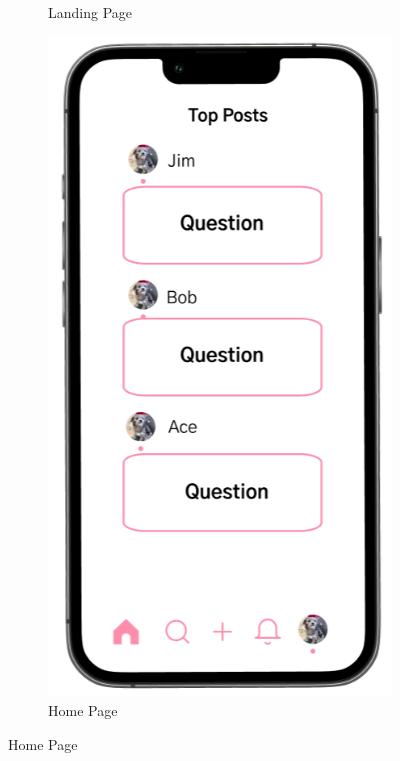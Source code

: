 \begin{figure}[!htbp]
\begin{subfigure}[b]{0.3\textwidth}
    \caption{Landing Page}
    \label{fig:landing}
  \end{subfigure}
  \hfill
  \begin{subfigure}[b]{0.3\textwidth}
    \includegraphics[width=\textwidth]{Figures/home.png}
    \caption{Home Page}
    \label{fig:home}
  \end{subfigure}

\end{figure}
